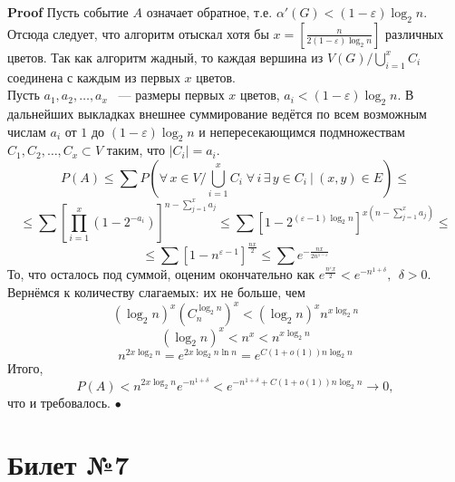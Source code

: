 \documentclass[a4paper]{article}
\theoremstyle{plain}
\theoremstyle{remark}
\theoremstyle{definition}
\renewenvironment{proof}{{\bfseries Proof}}{$\bullet$}
\newcommand{\myequat}[1]{\begin{equation} #1 \nonumber \end{equation}}
\newcommand{\class}[1]{\left[ #1 \right]}
\newcommand{\myO}{(1+o(1))}
\begin{document}
\begin{proof} Пусть событие $A$ означает обратное, т.е. $\alpha'(G)<(1-\varepsilon)\log_2 n$. Отсюда следует, что алгоритм отыскал хотя бы $x=\class{\frac{n}{2(1-\varepsilon)\log_2 n}}$ различных цветов. Так как алгоритм жадный, то каждая вершина из $V(G)/\bigcup_{i=1}^xC_i$ соединена с каждым из первых $x$ цветов.\\
Пусть $a_1,a_2,\dots,a_x$ ~--- размеры первых $x$ цветов, $a_i<(1-\varepsilon)\log_2 n$. В дальнейших выкладках внешнее суммирование ведётся по всем возможным числам $a_i$ от $1$ до $(1-\varepsilon)\log_2 n$ и непересекающимся подмножествам $C_1,C_2,\dots,C_x\subset V$ таким, что $|C_i|=a_i$.
\myequat{P(A)\leq \sum P(\forall\,x\in V/\bigcup_{i=1}^xC_i\;\forall\,i\,\exists\, y\in C_i\: | \: (x,y)\in E)\leq}
\myequat{\leq\sum \class{\prod_{i=1}^x(1-2^{-a_i})}^{n-\sum_{j=1}^xa_j}\leq\sum\class{1-2^{(\varepsilon-1)\log_2 n}}^{x(n-\sum_{j=1}^xa_j)}\leq}
\myequat{\leq\sum [1-n^{\varepsilon-1}]^{\frac{nx}{2}}\leq\sum e^{-\frac{nx}{2n^{1-\varepsilon}}}}
То, что осталось под суммой, оценим окончательно как $e^{\frac{n^{\varepsilon}x}{2}}<e^{-n^{1+\delta}},\:\:\delta>0$.\\
Вернёмся к количеству слагаемых: их не больше, чем
\myequat{(\log_2 n)^x (C_n^{\log_2 n})^x<(\log_2 n)^x n^{x\log_2 n}}
\myequat{(\log_2 n)^x<n^x<n^{x\log_2 n}}
\myequat{n^{2x\log_2 n}=e^{2x\log_2 n\ln n}=e^{C\myO n\log_2 n}}
Итого,
\myequat{P(A)<n^{2x\log_2 n}e^{-n^{1+\delta }}<e^{-n^{1+\delta}+C\myO n\log_2 n}\to 0,}
что и требовалось.
\end{proof}

\section{Билет №7}
\end{document}
